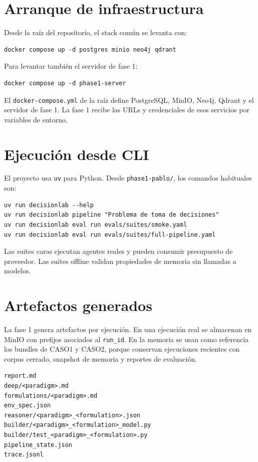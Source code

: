 \section{Arranque de infraestructura}

Desde la raíz del repositorio, el stack común se levanta con:

\begin{verbatim}
docker compose up -d postgres minio neo4j qdrant
\end{verbatim}

Para levantar también el servidor de fase 1:

\begin{verbatim}
docker compose up -d phase1-server
\end{verbatim}

El \texttt{docker-compose.yml} de la raíz define PostgreSQL, MinIO, Neo4j,
Qdrant y el servidor de fase 1. La fase 1 recibe las URLs y credenciales de esos
servicios por variables de entorno.

\section{Ejecución desde CLI}

El proyecto usa \texttt{uv} para Python. Desde \texttt{phase1-pablo/}, los
comandos habituales son:

\begin{verbatim}
uv run decisionlab --help
uv run decisionlab pipeline "Problema de toma de decisiones"
uv run decisionlab eval run evals/suites/smoke.yaml
uv run decisionlab eval run evals/suites/full-pipeline.yaml
\end{verbatim}

Las suites caras ejecutan agentes reales y pueden consumir presupuesto de
proveedor. Las suites offline validan propiedades de memoria sin llamadas a
modelos.

\section{Artefactos generados}

La fase 1 genera artefactos por ejecución. En una ejecución real se almacenan en
MinIO con prefijos asociados al \texttt{run\_id}. En la memoria se usan como
referencia los bundles de CASO1 y CASO2, porque conservan ejecuciones recientes
con corpus cerrado, snapshot de memoria y reportes de evaluación.

\begin{verbatim}
report.md
deep/<paradigm>.md
formulations/<paradigm>.md
env_spec.json
reasoner/<paradigm>_<formulation>.json
builder/<paradigm>_<formulation>_model.py
builder/test_<paradigm>_<formulation>.py
pipeline_state.json
trace.jsonl
\end{verbatim}


